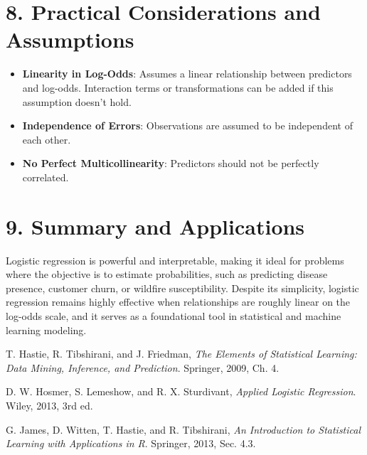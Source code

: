 \documentclass{article}
\begin{document}
\section*{8. Practical Considerations and Assumptions}

\begin{itemize}
    \item \textbf{Linearity in Log-Odds}: Assumes a linear relationship between predictors and log-odds. Interaction terms or transformations can be added if this assumption doesn’t hold.
    \item \textbf{Independence of Errors}: Observations are assumed to be independent of each other.
    \item \textbf{No Perfect Multicollinearity}: Predictors should not be perfectly correlated.
\end{itemize}

\section*{9. Summary and Applications}

Logistic regression is powerful and interpretable, making it ideal for problems where the objective is to estimate probabilities, such as predicting disease presence, customer churn, or wildfire susceptibility. Despite its simplicity, logistic regression remains highly effective when relationships are roughly linear on the log-odds scale, and it serves as a foundational tool in statistical and machine learning modeling.

\begin{thebibliography}{9}

T. Hastie, R. Tibshirani, and J. Friedman,
\textit{The Elements of Statistical Learning: Data Mining, Inference, and Prediction}.
Springer, 2009, Ch. 4.

D. W. Hosmer, S. Lemeshow, and R. X. Sturdivant,
\textit{Applied Logistic Regression}.
Wiley, 2013, 3rd ed.

G. James, D. Witten, T. Hastie, and R. Tibshirani,
\textit{An Introduction to Statistical Learning with Applications in R}.
Springer, 2013, Sec. 4.3.

\end{thebibliography}
\end{document}
